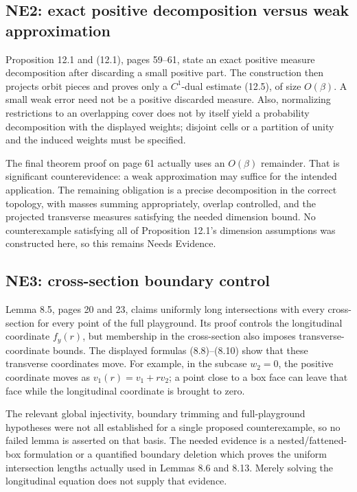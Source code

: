 \documentclass[10pt]{article}
\begin{document}
\subsection*{NE2: exact positive decomposition versus weak approximation}
Proposition 12.1 and (12.1), pages 59–61, state an exact positive measure decomposition after discarding a small positive part. The construction then projects orbit pieces and proves only a \(C^1\)-dual estimate (12.5), of size \(O(\beta)\). A small weak error need not be a positive discarded measure. Also, normalizing restrictions to an overlapping cover does not by itself yield a probability decomposition with the displayed weights; disjoint cells or a partition of unity and the induced weights must be specified.\par
The final theorem proof on page 61 actually uses an \(O(\beta)\) remainder. That is significant counterevidence: a weak approximation may suffice for the intended application. The remaining obligation is a precise decomposition in the correct topology, with masses summing appropriately, overlap controlled, and the projected transverse measures satisfying the needed dimension bound. No counterexample satisfying all of Proposition 12.1’s dimension assumptions was constructed here, so this remains Needs Evidence.\par
\subsection*{NE3: cross-section boundary control}
Lemma 8.5, pages 20 and 23, claims uniformly long intersections with every cross-section for every point of the full playground. Its proof controls the longitudinal coordinate \(f_y(r)\), but membership in the cross-section also imposes transverse-coordinate bounds. The displayed formulas (8.8)–(8.10) show that these transverse coordinates move. For example, in the subcase \(w_2=0\), the positive coordinate moves as \(v_1(r)=v_1+rv_2\); a point close to a box face can leave that face while the longitudinal coordinate is brought to zero.\par
The relevant global injectivity, boundary trimming and full-playground hypotheses were not all established for a single proposed counterexample, so no failed lemma is asserted on that basis. The needed evidence is a nested/fattened-box formulation or a quantified boundary deletion which proves the uniform intersection lengths actually used in Lemmas 8.6 and 8.13. Merely solving the longitudinal equation does not supply that evidence.\par
\end{document}
